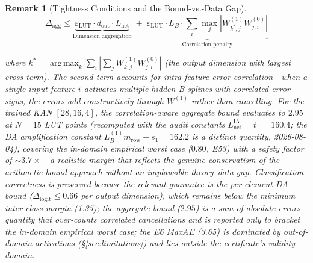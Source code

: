 \documentclass[journal,onecolumn]{IEEEtran}
\DeclareMathOperator*{\argmax}{arg\,max}
\newtheorem{remark}{Remark}
\begin{document}
\begin{remark}[Tightness Conditions and the Bound-vs.-Data Gap]
\begin{equation}
\Delta_{\text{agg}} \leq \underbrace{\varepsilon_{\text{LUT}} \cdot
d_{\text{out}} \cdot L_{\text{net}}}_{\text{Dimension aggregation}}
\;+\;
\underbrace{\varepsilon_{\text{LUT}} \cdot L_B \cdot
\sum_i \max_j |W^{(1)}_{k^*,j} W^{(0)}_{j,i}|}_{\text{Correlation penalty}}
\label{eq:correlation_aware}
\end{equation}

where $k^* = \argmax_k \sum_i |\sum_j W^{(1)}_{k,j} W^{(0)}_{j,i}|$ (the output
dimension with largest cross-term). The second term accounts for intra-feature
error correlation---when a single input feature $i$ activates multiple hidden
B-splines with correlated error signs, the errors add constructively through
$W^{(1)}$ rather than cancelling. For the trained KAN $[28,16,4]$, the
correlation-aware aggregate bound evaluates to $2.95$ at $N=15$ LUT points
(recomputed with the audit constants $L_{\text{net}}^{\text{IA}} = t_1 =
160.4$; the DA amplification constant $L_B^{(1)} m_{\text{row}} + s_1 =
162.2$ is a distinct quantity, 2026-08-04),
covering the in-domain empirical worst case ($0.80$, E53) with a safety
factor of ${\sim}3.7\times$---a realistic margin that reflects the genuine
conservatism of the arithmetic bound approach without an implausible
theory--data gap.
Classification correctness is preserved because the relevant guarantee is
the \emph{per-element} DA bound ($\Delta_{\text{logit}} \leq 0.66$ per output
dimension), which remains below the minimum inter-class margin (1.35);
the aggregate bound ($2.95$) is a sum-of-absolute-errors quantity that
over-counts correlated cancellations and is reported only to bracket the
in-domain empirical worst case; the E6 MaxAE (3.65) is dominated by
out-of-domain activations ({\S}\ref{sec:limitations}) and lies outside the
certificate's validity domain.
\end{remark}
\end{document}
